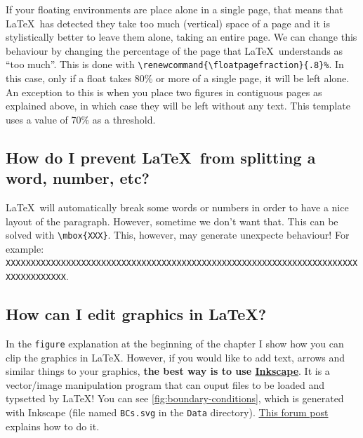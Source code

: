 If your floating environments are place alone in a single page, that means that \LaTeX\ has detected they take too much (vertical) space of a page and it is stylistically better to leave them alone, taking an entire page. We can change this behaviour by changing the percentage of the page that \LaTeX\ understands as ``too much''. This is done with \verb|\renewcommand{\floatpagefraction}{.8}%|. In this case, only if a float takes 80\% or more of a single page, it will be left alone. An exception to this is when you place two figures in contiguous pages as explained above, in which case they will be left without any text. This template uses a value of 70\% as a threshold.

\subsection{How do I prevent \LaTeX\ from splitting a word, number, etc?}

\LaTeX\ will automatically break some words or numbers in order to have a nice layout of the paragraph. However, sometime we don't want that. This can be solved with \verb|\mbox{XXX}|. This, however, may generate unexpecte behaviour! For example: \mbox{\texttt{XXXXXXXXXXXXXXXXXXXXXXXXXXXXXXXXXXXXXXXXXXXXXXXXXXXXXXXXXXXXXXXXXXXXXXXXXXXXXXXXXX}}.

\subsection{How can I edit graphics in \LaTeX?}

In the \verb|figure| explanation at the beginning of the chapter I show how you can clip the graphics in \LaTeX. However, if you would like to add text, arrows and similar things to your graphics, \textbf{the best way is to use \href{https://inkscape.org/}{Inkscape}}. It is a vector/image manipulation program that can ouput files to be loaded and typsetted by \LaTeX! You can see \cref{fig:boundary-conditions}, which is generated with Inkscape (file named \texttt{BCs.svg} in the \texttt{Data} directory). \href{https://tex.stackexchange.com/questions/151232/exporting-from-inkscape-to-latex-via-tikz}{This forum post} explains how to do it.


